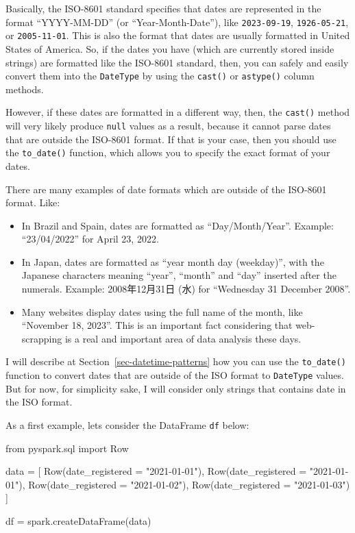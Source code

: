 \documentclass[
  11pt,
  letterpaper,
  DIV=11,
  numbers=noendperiod]{scrreprt}
\newenvironment{Shaded}{\begin{snugshade}}{\end{snugshade}}
\newcommand{\ImportTok}[1]{\textcolor[rgb]{0.00,0.46,0.62}{#1}}
\newcommand{\NormalTok}[1]{\textcolor[rgb]{0.00,0.23,0.31}{#1}}
\newcommand{\OperatorTok}[1]{\textcolor[rgb]{0.37,0.37,0.37}{#1}}
\newcommand{\StringTok}[1]{\textcolor[rgb]{0.13,0.47,0.30}{#1}}
\providecommand{\tightlist}{%
  \setlength{\itemsep}{0pt}\setlength{\parskip}{0pt}}\usepackage{longtable,booktabs,array}
\begin{document}
Basically, the ISO-8601 standard specifies that dates are represented in
the format ``YYYY-MM-DD'' (or ``Year-Month-Date''), like
\texttt{2023-09-19}, \texttt{1926-05-21}, or \texttt{2005-11-01}. This
is also the format that dates are usually formatted in United States of
America. So, if the dates you have (which are currently stored inside
strings) are formatted like the ISO-8601 standard, then, you can safely
and easily convert them into the \texttt{DateType} by using the
\texttt{cast()} or \texttt{astype()} column methods.

However, if these dates are formatted in a different way, then, the
\texttt{cast()} method will very likely produce \texttt{null} values as
a result, because it cannot parse dates that are outside the ISO-8601
format. If that is your case, then you should use the
\texttt{to\_date()} function, which allows you to specify the exact
format of your dates.

There are many examples of date formats which are outside of the
ISO-8601 format. Like:

\begin{itemize}
\tightlist
\item
  In Brazil and Spain, dates are formatted as ``Day/Month/Year''.
  Example: ``23/04/2022'' for April 23, 2022.
\item
  In Japan, dates are formatted as ``year month day (weekday)'', with
  the Japanese characters meaning ``year'', ``month'' and ``day''
  inserted after the numerals. Example: 2008年12月31日 (水) for
  ``Wednesday 31 December 2008''.
\item
  Many websites display dates using the full name of the month, like
  ``November 18, 2023''. This is an important fact considering that
  web-scrapping is a real and important area of data analysis these
  days.
\end{itemize}

I will describe at Section~\ref{sec-datetime-patterns} how you can use
the \texttt{to\_date()} function to convert dates that are outside of
the ISO format to \texttt{DateType} values. But for now, for simplicity
sake, I will consider only strings that contains date in the ISO format.

As a first example, lets consider the DataFrame \texttt{df} below:

\begin{Shaded}
\begin{Highlighting}[]
\ImportTok{from}\NormalTok{ pyspark.sql }\ImportTok{import}\NormalTok{ Row}

\NormalTok{data }\OperatorTok{=}\NormalTok{ [}
\NormalTok{    Row(date\_registered }\OperatorTok{=} \StringTok{"2021{-}01{-}01"}\NormalTok{),}
\NormalTok{    Row(date\_registered }\OperatorTok{=} \StringTok{"2021{-}01{-}01"}\NormalTok{),}
\NormalTok{    Row(date\_registered }\OperatorTok{=} \StringTok{"2021{-}01{-}02"}\NormalTok{),}
\NormalTok{    Row(date\_registered }\OperatorTok{=} \StringTok{"2021{-}01{-}03"}\NormalTok{)}
\NormalTok{]}

\NormalTok{df }\OperatorTok{=}\NormalTok{ spark.createDataFrame(data)}
\end{Highlighting}
\end{Shaded}
\end{document}
